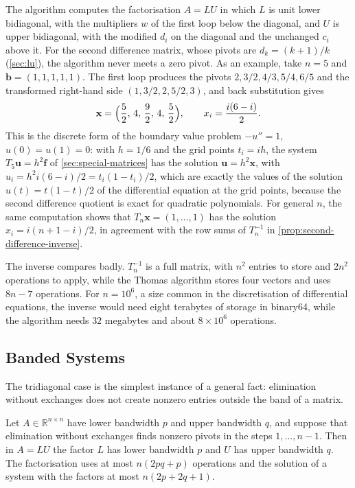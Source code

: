The algorithm computes the factorisation $A=LU$ in which $L$ is unit lower bidiagonal, with the multipliers $w$ of the first loop below the diagonal, and $U$ is upper bidiagonal, with the modified $d_i$ on the diagonal and the unchanged $c_i$ above it. For the second difference matrix, whose pivots are $d_k=(k+1)/k$ (\cref{sec:lu}), the algorithm never meets a zero pivot. As an example, take $n=5$ and $\mathbf b=(1,1,1,1,1)$. The first loop produces the pivots $2,3/2,4/3,5/4,6/5$ and the transformed right-hand side $(1,3/2,2,5/2,3)$, and back substitution gives
\[
\mathbf x=\Bigl(\frac52,\,4,\,\frac92,\,4,\,\frac52\Bigr),\qquad x_i=\frac{i(6-i)}2 .
\]
This is the discrete form of the boundary value problem $-u''=1$, $u(0)=u(1)=0$: with $h=1/6$ and the grid points $t_i=ih$, the system $T_5\mathbf u=h^2\mathbf f$ of \cref{sec:special-matrices} has the solution $\mathbf u=h^2\mathbf x$, with $u_i=h^2i(6-i)/2=t_i(1-t_i)/2$, which are exactly the values of the solution $u(t)=t(1-t)/2$ of the differential equation at the grid points, because the second difference quotient is exact for quadratic polynomials. For general $n$, the same computation shows that $T_n\mathbf x=(1,\ldots,1)$ has the solution $x_i=i(n+1-i)/2$, in agreement with the row sums of $T_n^{-1}$ in \cref{prop:second-difference-inverse}.

The inverse compares badly. $T_n^{-1}$ is a full matrix, with $n^2$ entries to store and $2n^2$ operations to apply, while the Thomas algorithm stores four vectors and uses $8n-7$ operations. For $n=10^6$, a size common in the discretisation of differential equations, the inverse would need eight terabytes of storage in binary64, while the algorithm needs $32$ megabytes and about $8\times10^6$ operations.

\subsection{Banded Systems}

The tridiagonal case is the simplest instance of a general fact: elimination without exchanges does not create nonzero entries outside the band of a matrix.

\begin{proposition}
\label{prop:band-lu}
Let $A\in\mathbb R^{n\times n}$ have lower bandwidth $p$ and upper bandwidth $q$, and suppose that elimination without exchanges finds nonzero pivots in the steps $1,\ldots,n-1$. Then in $A=LU$ the factor $L$ has lower bandwidth $p$ and $U$ has upper bandwidth $q$. The factorisation uses at most $n(2pq+p)$ operations and the solution of a system with the factors at most $n(2p+2q+1)$.
\end{proposition}


